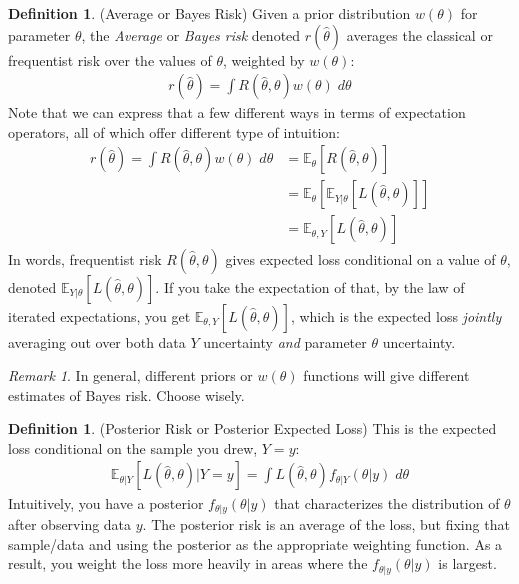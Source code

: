 \documentclass[12pt]{article}
\theoremstyle{plain}
\theoremstyle{definition}
\newtheorem{defn}[thm]{Definition}
\theoremstyle{remark}
\newtheorem*{rmk}{Remark}
\newcommand{\E}{\mathbb{E}}
\begin{document}
\begin{defn}(Average or Bayes Risk)
\label{defn:bayesrisk}
Given a prior distribution $w(\theta)$ for parameter $\theta$, the
\emph{Average} or \emph{Bayes risk} denoted $r(\hat{\theta})$ averages
the classical or frequentist risk over the values of $\theta$, weighted
by $w(\theta)$:
\begin{align*}
  r(\hat{\theta})
  = \int R(\hat{\theta},\theta) w(\theta) \; d\theta
\end{align*}
Note that we can express that a few different ways in terms of
expectation operators, all of which offer different type of intuition:
\begin{align*}
  r(\hat{\theta})
  = \int R(\hat{\theta},\theta) w(\theta) \; d\theta
  &= \E_\theta[ R(\hat{\theta},\theta)] \\
  &= \E_\theta\left[
      \E_{Y|\theta}\left[
      L(\hat{\theta},\theta)
      \right]
    \right] \\
  &= \E_{\theta,Y}\left[ L(\hat{\theta},\theta) \right]
\end{align*}
In words, frequentist risk $R(\hat{\theta},\theta)$ gives expected loss
conditional on a value of $\theta$, denoted
$\E_{Y|\theta}[L(\hat{\theta},\theta)]$. If you take the expectation of
that, by the law of iterated expectations, you get
$\E_{\theta,Y}[L(\hat{\theta},\theta)]$, which is the expected loss
\emph{jointly} averaging out over both data $Y$ uncertainty \emph{and}
parameter $\theta$ uncertainty.
\end{defn}
\begin{rmk}
In general, different priors or $w(\theta)$ functions will give
different estimates of Bayes risk. Choose wisely.
\end{rmk}

\begin{defn}{(Posterior Risk or Posterior Expected Loss)}
This is the expected loss conditional on the sample you drew, $Y=y$:
\begin{align*}
  \E_{\theta|Y}[L(\hat{\theta},\theta)|Y=y]
  =
  \int L(\hat{\theta},\theta) f_{\theta|Y}(\theta|y) \; d\theta
\end{align*}
Intuitively, you have a posterior $f_{\theta|y}(\theta|y)$ that
characterizes the distribution of $\theta$ after observing data
$y$. The posterior risk is an average of the loss, but fixing that
sample/data and using the posterior as the appropriate weighting
function. As a result, you weight the loss more heavily in areas where
the $f_{\theta|y}(\theta|y)$ is largest.
\end{defn}
\end{document}
